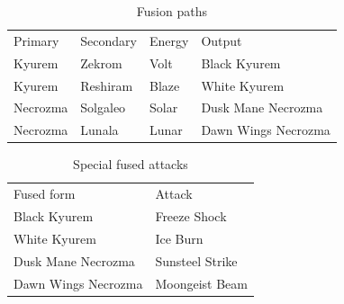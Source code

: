 \begin{table}
\centering
\begin{tabular}{llll}
Primary & Secondary & Energy & Output\\
\Midrule
Kyurem & Zekrom & Volt & Black Kyurem \\
Kyurem & Reshiram & Blaze & White Kyurem \\
Necrozma & Solgaleo & Solar & Dusk Mane Necrozma \\
Necrozma & Lunala & Lunar & Dawn Wings Necrozma \\
\end{tabular}
\caption{Fusion paths\label{table:fusion}}
\end{table}
\begin{table}
\centering
\begin{tabular}{ll}
Fused form & Attack\\
\Midrule
Black Kyurem & Freeze Shock \\
White Kyurem & Ice Burn\\
Dusk Mane Necrozma & Sunsteel Strike\\
Dawn Wings Necrozma & Moongeist Beam\\
\end{tabular}
\caption{Special fused attacks\label{table:fusionattacks}}
\end{table}



